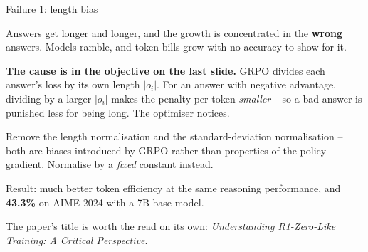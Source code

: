 \documentclass[aspectratio=169]{beamer}
\begin{document}
\begin{frame}{Failure 1: length bias}
  \begin{tcolorbox}[colback=armred!8, colframe=armred, boxrule=0.7pt, arc=2pt,
                    title={\textbf{The symptom}}]
    \small
    Answers get longer and longer, and the growth is concentrated in the \textbf{wrong} answers.
    Models ramble, and token bills grow with no accuracy to show for it.
  \end{tcolorbox}

  \vskip 6pt
  \small
  \textbf{The cause is in the objective on the last slide.} GRPO divides each answer's loss by
  its own length $|o_i|$. For an answer with negative advantage, dividing by a larger $|o_i|$
  makes the penalty per token \emph{smaller} -- so a bad answer is punished less for being long.
  The optimiser notices.

  \vskip 6pt
  \begin{tcolorbox}[colback=paramgreen!8, colframe=paramgreen, boxrule=0.7pt, arc=2pt,
                    title={\textbf{Dr. GRPO} (Liu et al., Sea AI Lab, 2025)}]
    \small
    Remove the length normalisation and the standard-deviation normalisation -- both are
    biases introduced by GRPO rather than properties of the policy gradient. Normalise by a
    \emph{fixed} constant instead.

    \vskip 3pt
    Result: much better token efficiency at the same reasoning performance, and
    \textbf{43.3\%} on AIME 2024 with a 7B base model.
  \end{tcolorbox}

  \vskip 4pt
  \begin{center}
    \footnotesize
    The paper's title is worth the read on its own: \emph{Understanding R1-Zero-Like Training:
    A Critical Perspective}.
  \end{center}
\end{frame}
\end{document}
